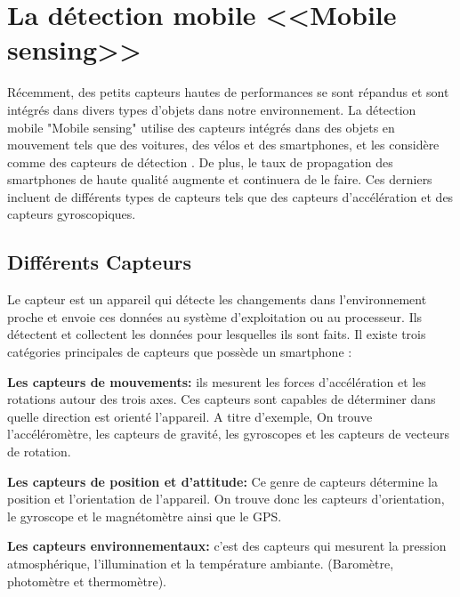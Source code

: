\renewcommand\labelitemi{-}
\renewcommand\labelitemii{$\circ$}
\renewcommand {\thesection}{\arabic{section}}
\chapter{La détection mobile <<Mobile sensing>>}

Récemment, des petits capteurs hautes de performances se sont répandus et sont intégrés dans divers types d'objets dans notre environnement.\newline
La détection mobile "Mobile sensing" utilise des capteurs intégrés dans des objets en mouvement tels que des voitures, des vélos et des smartphones, et les considère comme des capteurs de détection \cite{nomuraMethodEstimatingRoad2015}.\newline
De plus, le taux de propagation des smartphones de haute qualité augmente et continuera de le faire. Ces derniers incluent de différents types de capteurs tels que des capteurs d'accélération et des capteurs gyroscopiques.



\section{Différents Capteurs} 

Le capteur est un appareil qui détecte les changements dans l'environnement proche et envoie ces données au système d'exploitation ou au processeur. Ils détectent et collectent les données pour lesquelles ils sont faits.\newline
Il existe trois catégories principales de capteurs que possède un smartphone \cite{tilluMobileSensorsComponents2019}:

{\bf Les capteurs de mouvements:}
 ils mesurent les forces d'accélération et les rotations autour des trois axes.  Ces capteurs sont capables de déterminer dans quelle direction est orienté l’appareil. A titre d’exemple, On trouve l'accéléromètre, les capteurs de gravité, les gyroscopes et les capteurs de vecteurs de rotation.

 {\bf Les capteurs de position et d’attitude:}
  Ce genre de capteurs détermine la position et l’orientation de l'appareil. On trouve donc les capteurs d’orientation, le gyroscope et le magnétomètre ainsi que le GPS. 
 
 {\bf Les capteurs environnementaux:}
 c’est des capteurs qui mesurent la pression atmosphérique, l'illumination et la température ambiante. (Baromètre, photomètre et thermomètre).

